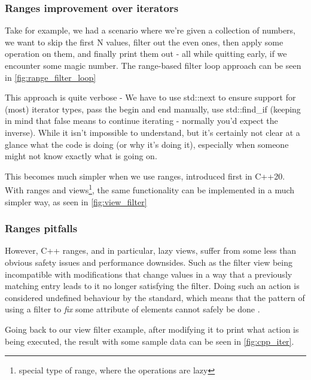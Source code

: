 \documentclass[
    english, %
]{VUMIFPSkursinis}
\begin{document}
\FloatBarrier
\subsubsection{Ranges improvement over iterators}

Take for example, we had a scenario where we're given a collection of numbers, we want to skip the first N values, filter out the even ones, then apply some operation on them, and finally print them out - all while quitting early, if we encounter some magic number. The range-based filter loop approach can be seen in \cref{fig:range_filter_loop}


This approach is quite verbose - We have to use std::next to ensure support for (most) iterator types, pass the begin and end manually, use std::find\_if (keeping in mind that false means to continue iterating - normally you'd expect the inverse). While it isn't impossible to understand, but it's certainly not clear at a glance what the code is doing (or why it's doing it), especially when someone might not know exactly what is going on.

This becomes much simpler when we use ranges, introduced first in C++20. With ranges and views\footnote{special type of range, where the operations are lazy}, the same functionality can be implemented in a much simpler way, as seen in \cref{fig:view_filter}


\FloatBarrier
\subsubsection{Ranges pitfalls}

However, C++ ranges, and in particular, lazy views, suffer from some less than obvious safety issues and performance downsides. Such as the filter view being incompatible with modifications that change values in a way that a previously matching entry leads to it no longer satisfying the filter. Doing such an action is considered undefined behaviour by the standard, which means that the pattern of using a filter to \textit{fix} some attribute of elements cannot safely be done \cite{C++Views}.

Going back to our view filter example, after modifying it to print what action is being executed, the result with some sample data can be seen in \cref{fig:cpp_iter}.
\end{document}
